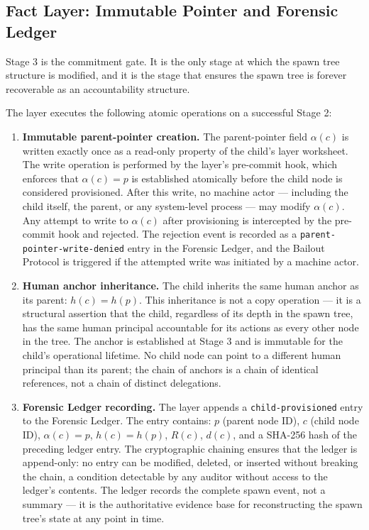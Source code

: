 \subsection{Fact Layer: Immutable Pointer and Forensic Ledger}
\label{sec:rsp-fact-layer}

Stage 3 is the commitment gate. It is the only stage at which the spawn tree structure is modified, and it is the stage that ensures the spawn tree is forever recoverable as an accountability structure.

The \fact{} layer executes the following atomic operations on a successful Stage 2:

\begin{enumerate}
\item[{(a)}] \textbf{Immutable parent-pointer creation.} The parent-pointer field $\alpha(c)$ is written exactly once as a read-only property of the child's \fact{} layer worksheet. The write operation is performed by the \fact{} layer's pre-commit hook, which enforces that $\alpha(c) = p$ is established atomically before the child node is considered provisioned. After this write, no machine actor — including the child itself, the parent, or any system-level process — may modify $\alpha(c)$. Any attempt to write to $\alpha(c)$ after provisioning is intercepted by the pre-commit hook and rejected. The rejection event is recorded as a \texttt{parent-pointer-write-denied} entry in the Forensic Ledger, and the Bailout Protocol is triggered if the attempted write was initiated by a machine actor.

\item[{(b)}] \textbf{Human anchor inheritance.} The child inherits the same human anchor as its parent: $h(c) = h(p)$. This inheritance is not a copy operation — it is a structural assertion that the child, regardless of its depth in the spawn tree, has the same human principal accountable for its actions as every other node in the tree. The anchor is established at Stage 3 and is immutable for the child's operational lifetime. No child node can point to a different human principal than its parent; the chain of anchors is a chain of identical references, not a chain of distinct delegations.

\item[{(c)}] \textbf{Forensic Ledger recording.} The \fact{} layer appends a \texttt{child-provisioned} entry to the Forensic Ledger. The entry contains: $p$ (parent node ID), $c$ (child node ID), $\alpha(c) = p$, $h(c) = h(p)$, $R(c)$, $d(c)$, and a SHA-256 hash of the preceding ledger entry. The cryptographic chaining ensures that the ledger is append-only: no entry can be modified, deleted, or inserted without breaking the chain, a condition detectable by any auditor without access to the ledger's contents. The ledger records the complete spawn event, not a summary — it is the authoritative evidence base for reconstructing the spawn tree's state at any point in time.
\end{enumerate}

